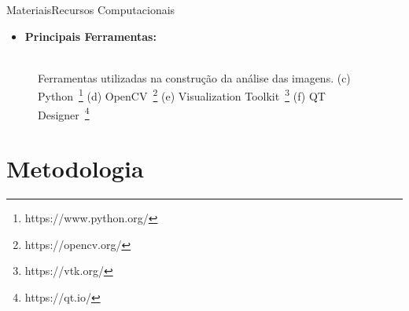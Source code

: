 \documentclass{beamer}
\begin{document}
\begin{frame}{Materiais}{Recursos Computacionais}
  \begin{itemize}
      \item \textbf{Principais Ferramentas:}
  \end{itemize}  
    \begin{figure}[!htb]
        \centering
         \hspace*{0.3cm}
        \hspace*{0.3cm}
         \hspace*{0.3cm}
         \hspace*{0.3cm}
        \\
         \scriptsize{Ferramentas utilizadas na construção da análise das imagens. (c) Python~\protect\footnote{https://www.python.org/} (d) OpenCV~\protect\footnote{https://opencv.org/} (e) Visualization Toolkit~\protect\footnote{https://vtk.org/} (f) QT Designer~\protect\footnote{https://qt.io/}}
        
    \end{figure}
\end{frame}


\section{Metodologia}
\end{document}
